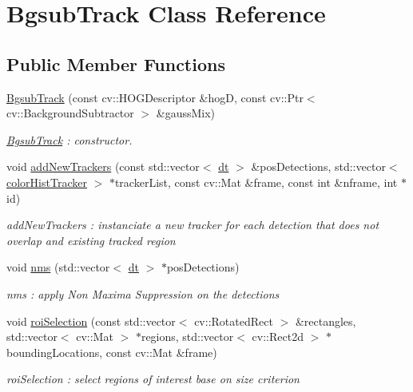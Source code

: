 \hypertarget{classBgsubTrack}{}\section{Bgsub\+Track Class Reference}
\label{classBgsubTrack}
\subsection*{Public Member Functions}
\begin{DoxyCompactItemize}
\item 
\hyperlink{classBgsubTrack_a58433c9fcaaa9b91b01cb3a06377d5f4}{Bgsub\+Track} (const cv\+::\+H\+O\+G\+Descriptor \&hogD, const cv\+::\+Ptr$<$ cv\+::\+Background\+Subtractor $>$ \&gauss\+Mix)
\begin{DoxyCompactList}\small\item\em \hyperlink{classBgsubTrack}{Bgsub\+Track} \+: constructor. \end{DoxyCompactList}\item 
void \hyperlink{classBgsubTrack_afdd2aae8d4726564bfeefca64172ddc3}{add\+New\+Trackers} (const std\+::vector$<$ \hyperlink{structdt}{dt} $>$ \&pos\+Detections, std\+::vector$<$ \hyperlink{structcolorHistTracker}{color\+Hist\+Tracker} $>$ $\ast$tracker\+List, const cv\+::\+Mat \&frame, const int \&nframe, int $\ast$id)
\begin{DoxyCompactList}\small\item\em add\+New\+Trackers \+: instanciate a new tracker for each detection that does not overlap and existing tracked region \end{DoxyCompactList}\item 
void \hyperlink{classBgsubTrack_a1b848d938094dca656d42d2cdcd7e4e3}{nms} (std\+::vector$<$ \hyperlink{structdt}{dt} $>$ $\ast$pos\+Detections)
\begin{DoxyCompactList}\small\item\em nms \+: apply Non Maxima Suppression on the detections \end{DoxyCompactList}\item 
void \hyperlink{classBgsubTrack_a3d481dd5be339cc708ba0ccafa75effa}{roi\+Selection} (const std\+::vector$<$ cv\+::\+Rotated\+Rect $>$ \&rectangles, std\+::vector$<$ cv\+::\+Mat $>$ $\ast$regions, std\+::vector$<$ cv\+::\+Rect2d $>$ $\ast$bounding\+Locations, const cv\+::\+Mat \&frame)
\begin{DoxyCompactList}\small\item\em roi\+Selection \+: select regions of interest base on size criterion \end{DoxyCompactList}\item 

\end{DoxyCompactItemize}

